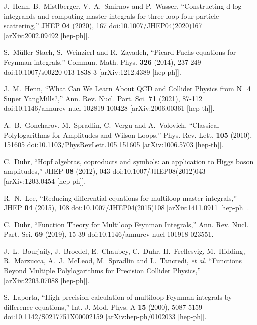 J.~Henn, B.~Mistlberger, V.~A.~Smirnov and P.~Wasser,
``Constructing d-log integrands and computing master integrals for three-loop four-particle scattering,''
JHEP \textbf{04} (2020), 167
doi:10.1007/JHEP04(2020)167
[arXiv:2002.09492 [hep-ph]].

S.~M\"uller-Stach, S.~Weinzierl and R.~Zayadeh,
``Picard-Fuchs equations for Feynman integrals,''
Commun. Math. Phys. \textbf{326} (2014), 237-249
doi:10.1007/s00220-013-1838-3
[arXiv:1212.4389 [hep-ph]].

J.~M.~Henn,
``What Can We Learn About QCD and Collider Physics from N=4 Super Yang\textendash{}Mills?,''
Ann. Rev. Nucl. Part. Sci. \textbf{71} (2021), 87-112
doi:10.1146/annurev-nucl-102819-100428
[arXiv:2006.00361 [hep-th]].

A.~B.~Goncharov, M.~Spradlin, C.~Vergu and A.~Volovich,
``Classical Polylogarithms for Amplitudes and Wilson Loops,''
Phys. Rev. Lett. \textbf{105} (2010), 151605
doi:10.1103/PhysRevLett.105.151605
[arXiv:1006.5703 [hep-th]].

C.~Duhr,
``Hopf algebras, coproducts and symbols: an application to Higgs boson amplitudes,''
JHEP \textbf{08} (2012), 043
doi:10.1007/JHEP08(2012)043
[arXiv:1203.0454 [hep-ph]].

R.~N.~Lee,
``Reducing differential equations for multiloop master integrals,''
JHEP \textbf{04} (2015), 108
doi:10.1007/JHEP04(2015)108
[arXiv:1411.0911 [hep-ph]].

C.~Duhr,
``Function Theory for Multiloop Feynman Integrals,''
Ann. Rev. Nucl. Part. Sci. \textbf{69} (2019), 15-39
doi:10.1146/annurev-nucl-101918-023551.

J.~L.~Bourjaily, J.~Broedel, E.~Chaubey, C.~Duhr, H.~Frellesvig, M.~Hidding, R.~Marzucca, A.~J.~McLeod, M.~Spradlin and L.~Tancredi, \textit{et al.}
``Functions Beyond Multiple Polylogarithms for Precision Collider Physics,''
[arXiv:2203.07088 [hep-ph]].

S.~Laporta,
``High precision calculation of multiloop Feynman integrals by difference equations,''
Int. J. Mod. Phys. A \textbf{15} (2000), 5087-5159
doi:10.1142/S0217751X00002159
[arXiv:hep-ph/0102033 [hep-ph]].

